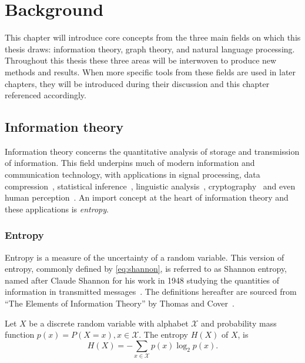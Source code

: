 \chapter{Background}\label{ch:background}

This chapter will introduce core concepts from the three main fields on which this thesis draws: information theory, graph theory, and natural language processing. Throughout this thesis these three areas will be interwoven to produce new methods and results. When more specific tools from these fields are used in later chapters, they will be introduced during their discussion and this chapter referenced accordingly.

\section{Information theory}
Information theory concerns the quantitative analysis of storage and transmission of information. This field underpins much of modern information and communication technology, with applications in signal processing, data compression~\cite{schurmann1996entropy, bell1989modeling}, statistical inference~\cite{burnham_model_2002}, linguistic analysis~\cite{collobert2011natural,greenbergUniversalsLanguage1963}, cryptography~\cite{menezes2018handbook} and even human perception~\cite{delgado-bonal_human_2016}. An import concept at the heart of information theory and these applications is \emph{entropy}.

\subsection{Entropy}
Entropy is a measure of the uncertainty of a random variable. This version of entropy, commonly defined by \autoref{eq:shannon}, is referred to as Shannon entropy, named after Claude Shannon for his work in 1948 studying the quantities of information in transmitted messages~\cite{shannon_mathematical_1948}. The definitions hereafter are sourced from ``The Elements of Information Theory'' by Thomas and Cover~\cite{cover_elements_2012}.

\begin{definition}
	Let $X$ be a discrete random variable with alphabet $\mathcal{X}$ and probability mass function $p(x) = P(X = x), x \in \mathcal{X}$.
	The entropy $H(X)$ of $X$, is 
	\begin{equation}\label{eq:shannon}
	H(X)=-\sum_{x \in \mathcal{X}} p(x) \log_2 p(x).
	\end{equation}
\end{definition} 

